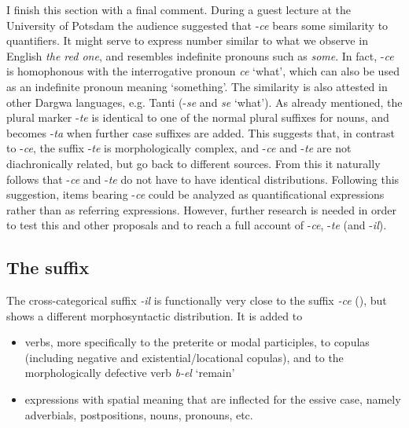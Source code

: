 I finish this section with a final comment. During a guest lecture at the University of Potsdam the audience suggested that -\textit{ce} bears some similarity to quantifiers. It might serve to express number similar to what we observe in English \textit{the red one}, and resembles indefinite pronouns such as \textit{some}. In fact, -\textit{ce} is homophonous with the interrogative pronoun \textit{ce} `what', which can also be used as an indefinite pronoun meaning `something'. The similarity is also attested in other Dargwa languages, e.g. Tanti (-\textit{se} and \textit{se} `what'). As already mentioned, the plural marker -\textit{te} is identical to one of the normal plural suffixes for nouns, and becomes -\textit{ta} when further case suffixes are added. This suggests that, in contrast to -\textit{ce}, the suffix -\textit{te} is morphologically complex, and -\textit{ce} and -\textit{te} are not diachronically related, but go back to different sources. From this it naturally follows that -\textit{ce} and -\textit{te} do not have to have identical distributions. Following this suggestion, items bearing -\textit{ce} could be analyzed as quantificational expressions rather than as referring expressions. However, further research is needed in order to test this and other proposals and to reach a full account of -\textit{ce}, -\textit{te} (and -\textit{il}).



\subsection{The suffix }
\label{ssec:The -il attributive}

The cross-categorical suffix \textit{-il} is functionally very close to the suffix \textit{-ce} (), but shows a different morphosyntactic distribution. It is added to 
\begin{itemize}
	\item verbs, more specifically to the preterite or modal participles, to copulas (including negative and existential\slash locational copulas), and to the morphologically defective verb \textit{b-el} `remain'
	\item expressions with spatial meaning that are inflected for the essive case, namely adverbials, postpositions, nouns, pronouns, etc.
\end{itemize}

